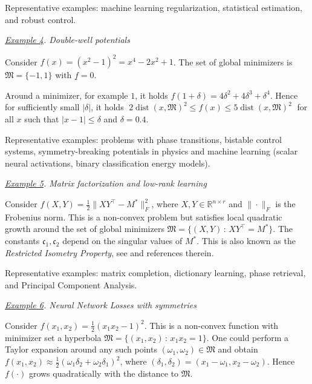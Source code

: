 \documentclass[12pt]{amsart}
\numberwithin{equation}{section}
\theoremstyle{plain}
\begin{document}
Representative examples: machine learning regularization, statistical estimation, and robust control.





\textbullet\; \textit{\underline{Example 4}. Double-well potentials}

Consider  $f(x) = (x^{2} - 1)^{2} = x^{4} - 2x^{2} + 1$. The set of global minimizers is $\mathfrak{M} = \{-1, 1\}$ with $\underline{f} = 0$. 

Around a minimizer, for example $1$, it holds $f(1 + \delta) = 4\delta^{2} + 4\delta^{3} + \delta^{4}$. Hence for sufficiently small $|\delta|$, it holds $\; 2 \operatorname{dist}(x,\mathfrak{M})^{2} \leq f(x) \leq 5\operatorname{dist}(x,\mathfrak{M})^{2} \;$ for all $x$ such that $ |x-1| \leq \delta$ and $\delta =0.4$.

Representative examples: problems with phase transitions, bistable control systems, symmetry-breaking potentials in physics and machine learning (scalar neural activations, binary classification energy models).


\textbullet\; \textit{\underline{Example 5}. Matrix factorization and low-rank learning}

Consider  $f(X,Y) = \frac{1}{2} \|XY^{\top} - M^{*}\|^{2}_{F}$, where $X,Y\in \mathbb{R}^{n\times r}$ and $\|\cdot\|_{F}$ is the Frobenius norm. This is a non-convex problem but satisfies local quadratic growth around the set of global minimizers $\mathfrak{M} =\{(X,Y)\,:\, XY^{\top} = M^{*}\}$. The constants $\mathfrak{c}_{1},\mathfrak{c}_{2}$ depend on the singular values of $M^{*}$. 
This is also known as the \textit{Restricted Isometry Property}, see \cite[Definition 3.1]{tu2016low} and references therein.


Representative examples: matrix completion, dictionary learning, phase retrieval, and Principal Component Analysis.


\textbullet\; \textit{\underline{Example 6}. Neural Network Losses with symmetries} 

Consider  $f(x_{1}, x_{2}) = \frac{1}{2}(x_{1}x_{2} - 1)^{2}$. This is a non-convex function with minimizer set a hyperbola $\mathfrak{M} = \{(x_{1},x_{2}) \,:\, x_{1}x_{2} = 1\}$. One could perform a Taylor expansion around any such points $(\omega_{1},\omega_{2})\in \mathfrak{M}$ and obtain $f(x_{1},x_{2}) \approx \frac{1}{2}(\omega_{1} \delta_{2} + \omega_{2}\delta_{1})^{2}$, where $(\delta_{1}, \delta_{2}) = (x_{1} - \omega_{1}, x_{2} - \omega_{2})$. Hence $f(\cdot)$ grows quadratically with the distance to $\mathfrak{M}$. 
\end{document}

